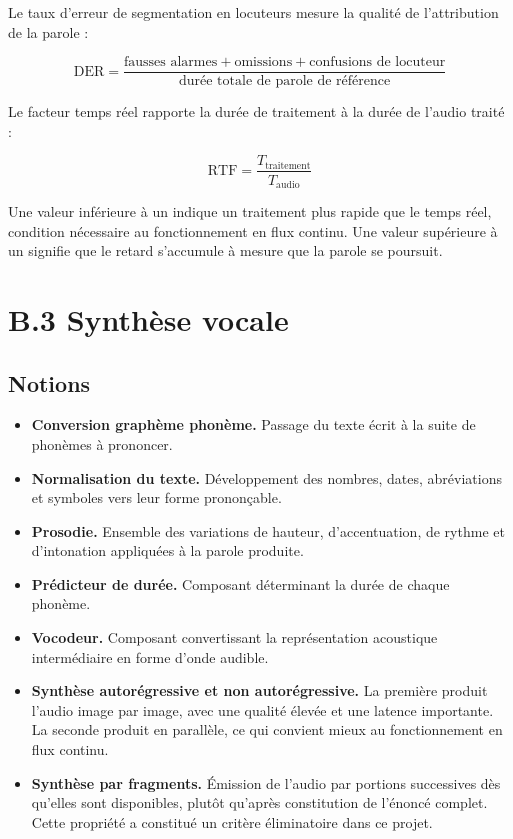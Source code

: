 Le taux d'erreur de segmentation en locuteurs mesure la qualité de l'attribution de la parole :

\begin{equation}
\mathrm{DER} = \frac{\text{fausses alarmes} + \text{omissions} + \text{confusions de locuteur}}{\text{durée totale de parole de référence}}
\end{equation}

Le facteur temps réel rapporte la durée de traitement à la durée de l'audio traité :

\begin{equation}
\mathrm{RTF} = \frac{T_{\mathrm{traitement}}}{T_{\mathrm{audio}}}
\end{equation}

Une valeur inférieure à un indique un traitement plus rapide que le temps réel, condition nécessaire au fonctionnement en flux continu. Une valeur supérieure à un signifie que le retard s'accumule à mesure que la parole se poursuit.

\section*{B.3 Synthèse vocale}

\subsection*{Notions}

\begin{itemize}
  \item \textbf{Conversion graphème phonème.} Passage du texte écrit à la suite de phonèmes à prononcer.
  \item \textbf{Normalisation du texte.} Développement des nombres, dates, abréviations et symboles vers leur forme prononçable.
  \item \textbf{Prosodie.} Ensemble des variations de hauteur, d'accentuation, de rythme et d'intonation appliquées à la parole produite.
  \item \textbf{Prédicteur de durée.} Composant déterminant la durée de chaque phonème.
  \item \textbf{Vocodeur.} Composant convertissant la représentation acoustique intermédiaire en forme d'onde audible.
  \item \textbf{Synthèse autorégressive et non autorégressive.} La première produit l'audio image par image, avec une qualité élevée et une latence importante. La seconde produit en parallèle, ce qui convient mieux au fonctionnement en flux continu.
  \item \textbf{Synthèse par fragments.} Émission de l'audio par portions successives dès qu'elles sont disponibles, plutôt qu'après constitution de l'énoncé complet. Cette propriété a constitué un critère éliminatoire dans ce projet.
\end{itemize}

